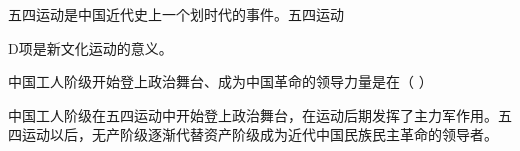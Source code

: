 \question 五四运动是中国近代史上一个划时代的事件。五四运动
\par{}
\begin{solution}D项是新文化运动的意义。
\end{solution}
\question 中国工人阶级开始登上政治舞台、成为中国革命的领导力量是在（ ）
\par{}
\begin{solution}中国工人阶级在五四运动中开始登上政治舞台，在运动后期发挥了主力军作用。五四运动以后，无产阶级逐渐代替资产阶级成为近代中国民族民主革命的领导者。
\end{solution}
